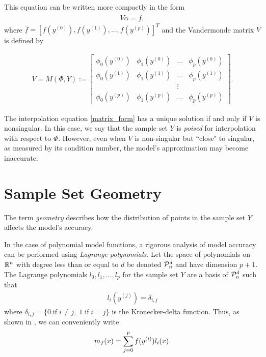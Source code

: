 This equation can be written more compactly in the form
\begin{align}
\label{matrix_form}
V \alpha = \bar{f},
\end{align}
where $\bar{f} = [f(y^{(0)}), f(y^{(1)}), \ldots, f(y^{(p)})]^T$ and the Vandermonde matrix $V$ is defined by 

\begin{align}
\label{vandermonde}
V=M(\Phi,Y) :=
\begin{bmatrix}
    \phi_0(y^{(0)})      & \phi_1(y^{(0)})       & \ldots & \phi_{p}(y^{(0)})      \\
    \phi_0(y^{(1)})      & \phi_1(y^{(1)})       & \dots  & \phi_{p}(y^{(1)})      \\
                     &                   & \vdots &                    \\
    \phi_0(y^{(p)})    & \phi_1(y^{(p)})     & \ldots & \phi_{p}(y^{{(p)}})
\end{bmatrix}.
\end{align}


The interpolation equation \cref{matrix_form} has a unique solution if and only if $V$ is nonsingular.
In this case, we say that the sample set $Y$ is \emph{poised} for interpolation with respect to $\Phi$. 
However, even when $V$ is non-singular but ``close" to singular, as measured by its condition number, 
the model's approximation may become inaccurate.


\section{Sample Set Geometry}

\label{geometry}
The term \emph{geometry} describes how the distribution of points in the sample set $Y$ affects the model's accuracy.

In the case of polynomial model functions, a rigorous analysis of model accuracy can be performed using \emph{Lagrange polynomials}.
Let the space of polynomials on $\mathbb R^n$ with degree less than or equal to $d$ be denoted $\mathcal{P}^d_n$ and have dimension $p+1$.
The Lagrange polynomials $l_0, l_1, \ldots, l_p$ for the sample set $Y$ are a basis of $\mathcal{P}^d_n$ such that
\begin{align}
l_i(y^{(j)}) = \delta_{i,j}
\end{align}
where $\delta_{i,j} = \{0 \;\text{if}\; i\ne j,\; 1 \;\text{if} \; i = j \}$ is the Kronecker-delta function.
Thus, as shown in \cite{introduction_book}, we can conveniently write
\begin{align}
\label{reg}
{{m}_f}(x) = \sum^p_{j=0}f(y^{(i)})l_i(x).
\end{align}


